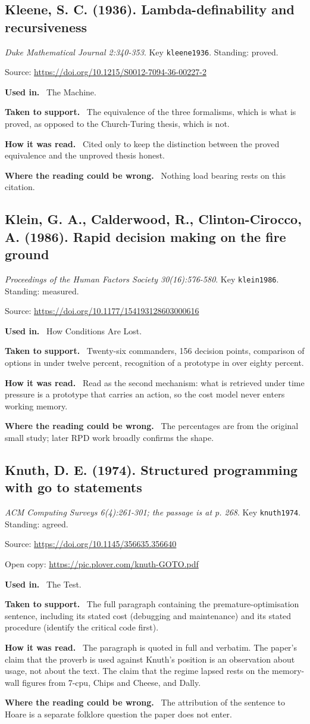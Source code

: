 \documentclass[11pt,oneside]{article}
\newcommand{\field}[1]{\par\noindent\textbf{\color{accent}#1.}\ }
\begin{document}
\hypertarget{src:kleene1936}{}
\subsection*{Kleene, S. C. (1936). Lambda-definability and recursiveness}
\noindent\small\emph{Duke Mathematical Journal 2:340-353}. Key \texttt{kleene1936}. Standing: proved.
\par\noindent\small Source: \url{https://doi.org/10.1215/S0012-7094-36-00227-2}
\normalsize
\field{Used in} The Machine.
\field{Taken to support} The equivalence of the three formalisms, which is what is proved, as opposed to the Church-Turing thesis, which is not.
\field{How it was read} Cited only to keep the distinction between the proved equivalence and the unproved thesis honest.
\field{Where the reading could be wrong} Nothing load bearing rests on this citation.

\hypertarget{src:klein1986}{}
\subsection*{Klein, G. A., Calderwood, R., Clinton-Cirocco, A. (1986). Rapid decision making on the fire ground}
\noindent\small\emph{Proceedings of the Human Factors Society 30(16):576-580}. Key \texttt{klein1986}. Standing: measured.
\par\noindent\small Source: \url{https://doi.org/10.1177/154193128603000616}
\normalsize
\field{Used in} How Conditions Are Lost.
\field{Taken to support} Twenty-six commanders, 156 decision points, comparison of options in under twelve percent, recognition of a prototype in over eighty percent.
\field{How it was read} Read as the second mechanism: what is retrieved under time pressure is a prototype that carries an action, so the cost model never enters working memory.
\field{Where the reading could be wrong} The percentages are from the original small study; later RPD work broadly confirms the shape.

\hypertarget{src:knuth1974}{}
\subsection*{Knuth, D. E. (1974). Structured programming with go to statements}
\noindent\small\emph{ACM Computing Surveys 6(4):261-301; the passage is at p. 268}. Key \texttt{knuth1974}. Standing: agreed.
\par\noindent\small Source: \url{https://doi.org/10.1145/356635.356640}
\par\noindent\small Open copy: \url{https://pic.plover.com/knuth-GOTO.pdf}
\normalsize
\field{Used in} The Test.
\field{Taken to support} The full paragraph containing the premature-optimisation sentence, including its stated cost (debugging and maintenance) and its stated procedure (identify the critical code first).
\field{How it was read} The paragraph is quoted in full and verbatim. The paper's claim that the proverb is used against Knuth's position is an observation about usage, not about the text. The claim that the regime lapsed rests on the memory-wall figures from 7-cpu, Chips and Cheese, and Dally.
\field{Where the reading could be wrong} The attribution of the sentence to Hoare is a separate folklore question the paper does not enter.
\end{document}
